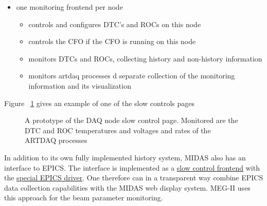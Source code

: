 \begin{itemize}
\item
  one monitoring frontend per node 
  \begin{itemize}
  \item
    controls and configures DTC's and ROCs on this node
  \item
    controls the CFO if the CFO is running on this node
  \item
    monitors DTCs and ROCs, collecting history and non-history information
  \item
    monitors artdaq processes d separate collection of the monitoring information and its visualization
  \end{itemize}
\end{itemize}

Figure ~\ref{figure:slow_controls_node_page} gives an example of one of the slow controls pages

\begin{figure}[H]
  \caption{
    \label{figure:slow_controls_node_page}
    A prototype of the DAQ node slow control page. Monitored are the DTC and ROC temperatures and voltages
    and rates of the ARTDAQ processes
  }
\end{figure}


In addition to its own fully implemented history system, MIDAS also has an interface to EPICS.
The interface is implemented as a 
\href{https://bitbucket.org/tmidas/midas/src/develop/examples/epics/}
         {\blue slow control frontend} with the 
\href{https://bitbucket.org/tmidas/midas/src/develop/drivers/device/epics_ca.cxx}
{\blue special EPICS driver}.
%
One therefore can in a transparent way combine EPICS data collection capabilities 
with the MIDAS web display system. MEG-II uses this approach for the beam parameter monitoring.



